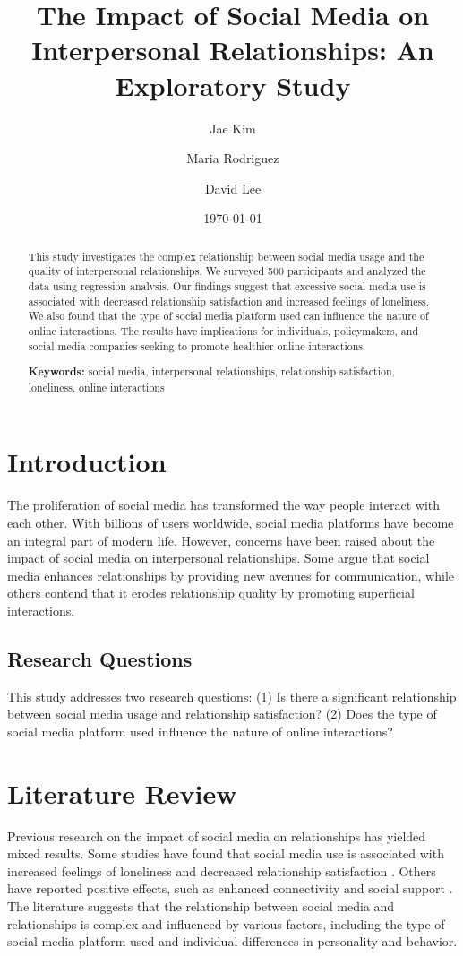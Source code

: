 \documentclass[12pt,a4paper]{article}
\title{The Impact of Social Media on Interpersonal Relationships: An Exploratory Study}
\author{Jae Kim \and Maria Rodriguez \and David Lee}
\date{\today}
\begin{document}
\maketitle
\thispagestyle{empty}

\begin{abstract}
This study investigates the complex relationship between social media usage and the quality of interpersonal relationships. We surveyed 500 participants and analyzed the data using regression analysis. Our findings suggest that excessive social media use is associated with decreased relationship satisfaction and increased feelings of loneliness. We also found that the type of social media platform used can influence the nature of online interactions. The results have implications for individuals, policymakers, and social media companies seeking to promote healthier online interactions.

\textbf{Keywords:} social media, interpersonal relationships, relationship satisfaction, loneliness, online interactions
\end{abstract}

\newpage
\tableofcontents
\newpage

\twocolumn
\section{Introduction}
The proliferation of social media has transformed the way people interact with each other. With billions of users worldwide, social media platforms have become an integral part of modern life. However, concerns have been raised about the impact of social media on interpersonal relationships. Some argue that social media enhances relationships by providing new avenues for communication, while others contend that it erodes relationship quality by promoting superficial interactions.

\subsection{Research Questions}
This study addresses two research questions: (1) Is there a significant relationship between social media usage and relationship satisfaction? (2) Does the type of social media platform used influence the nature of online interactions?

\section{Literature Review}
Previous research on the impact of social media on relationships has yielded mixed results. Some studies have found that social media use is associated with increased feelings of loneliness and decreased relationship satisfaction \citep{kaplan2013}. Others have reported positive effects, such as enhanced connectivity and social support \citep{burke2010}. The literature suggests that the relationship between social media and relationships is complex and influenced by various factors, including the type of social media platform used and individual differences in personality and behavior.
\end{document}
